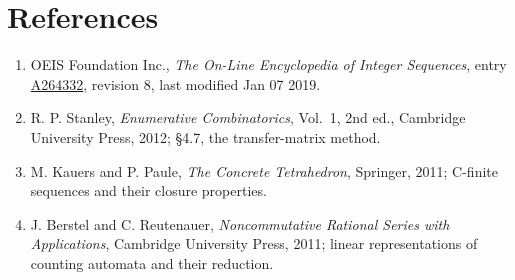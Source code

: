 \documentclass[11pt]{article}
\theoremstyle{definition}
\begin{document}
\section{References}

\begin{enumerate}

\item OEIS Foundation Inc., \emph{The On-Line Encyclopedia of Integer Sequences}, entry \href{https://oeis.org/A264332}{A264332}, revision 8, last modified Jan 07 2019.

\item R. P. Stanley, \emph{Enumerative Combinatorics}, Vol.~1, 2nd ed., Cambridge University Press, 2012; \S4.7, the transfer-matrix method.

\item M. Kauers and P. Paule, \emph{The Concrete Tetrahedron}, Springer, 2011; C-finite sequences and their closure properties.

\item J. Berstel and C. Reutenauer, \emph{Noncommutative Rational Series with Applications}, Cambridge University Press, 2011; linear representations of counting automata and their reduction.

\end{enumerate}
\end{document}
